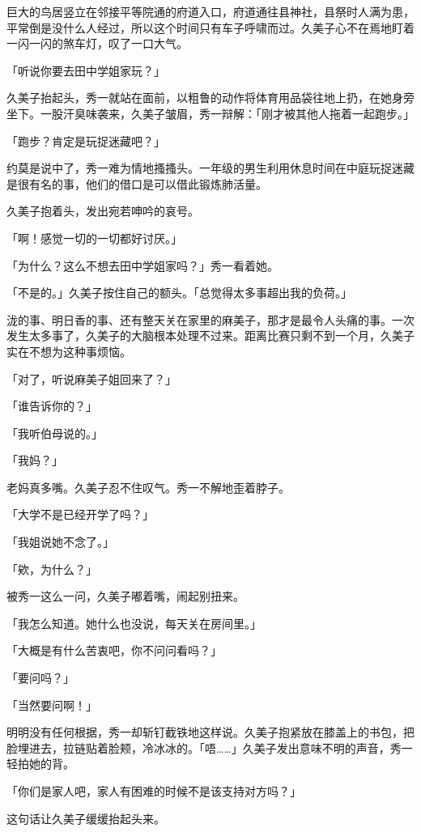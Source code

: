 \documentclass[UTF8]{ctexart}
\begin{document}
    巨大的鸟居竖立在邻接平等院通的府道入口，府道通往县神社，县祭时人满为患，平常倒是没什么人经过，所以这个时间只有车子呼啸而过。久美子心不在焉地盯着一闪一闪的煞车灯，叹了一口大气。 

    「听说你要去田中学姐家玩？」 

    久美子抬起头，秀一就站在面前，以粗鲁的动作将体育用品袋往地上扔，在她身旁坐下。一股汗臭味袭来，久美子皱眉，秀一辩解：「刚才被其他人拖着一起跑步。」 

    「跑步？肯定是玩捉迷藏吧？」 

    约莫是说中了，秀一难为情地搔搔头。一年级的男生利用休息时间在中庭玩捉迷藏是很有名的事，他们的借口是可以借此锻炼肺活量。 

    久美子抱着头，发出宛若呻吟的哀号。 

    「啊！感觉一切的一切都好讨厌。」 

    「为什么？这么不想去田中学姐家吗？」秀一看着她。 

    「不是的。」久美子按住自己的额头。「总觉得太多事超出我的负荷。」 

    泷的事、明日香的事、还有整天关在家里的麻美子，那才是最令人头痛的事。一次发生太多事了，久美子的大脑根本处理不过来。距离比赛只剩不到一个月，久美子实在不想为这种事烦恼。 

    「对了，听说麻美子姐回来了？」 

    「谁告诉你的？」 

    「我听伯母说的。」 

    「我妈？」 

    老妈真多嘴。久美子忍不住叹气。秀一不解地歪着脖子。 

    「大学不是已经开学了吗？」 

    「我姐说她不念了。」 

    「欸，为什么？」 

    被秀一这么一问，久美子嘟着嘴，闹起别扭来。 

    「我怎么知道。她什么也没说，每天关在房间里。」 

    「大概是有什么苦衷吧，你不问问看吗？」 

    「要问吗？」 

    「当然要问啊！」 

    明明没有任何根据，秀一却斩钉截铁地这样说。久美子抱紧放在膝盖上的书包，把脸埋进去，拉链贴着脸颊，冷冰冰的。「唔……」久美子发出意味不明的声音，秀一轻拍她的背。 

    「你们是家人吧，家人有困难的时候不是该支持对方吗？」 

    这句话让久美子缓缓抬起头来。 
\end{document}
